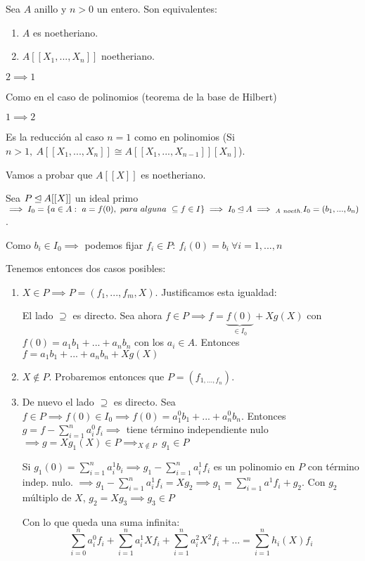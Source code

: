 \documentclass[openany]{book}
\begin{document}
\begin{theorem}
    $  $

    Sea $ A $ anillo y $ n>0 $ un entero. Son equivalentes:
    \begin{enumerate}
        \item $ A $ es noetheriano.
        \item $ A[[X_1,...,X_n]] $ noetheriano.
    \end{enumerate}

\end{theorem}

\begin{demonstration}
    $ 2\implies1 $

    Como en el caso de polinomios (teorema de la base de Hilbert)

    \noindent$ 1\implies 2 $

    Es la reducción al caso $ n = 1 $ como en polinomios (Si $ n>1,\ A[[X_1,...,X_n]]\cong A[[X_1,...,X_{n-1}]][X_n] $).

    Vamos a probar que $ A[[X]] $ es noetheriano.

    Sea $ P \unlhd A[[X]] $ un ideal primo $ \implies I_0 = \{a \in A:\ a = f(0),\ para\ alguna\ \subseteq f \in I\} \implies I_0 \ideal A \implies_{A\ noeth.} I_0 = (b_1,...,b_n)$.

    Como $ b_i \in I_0 \implies $ podemos fijar $ f_{i} \in P:\ f_i(0) =b_i\ \forall i = 1,...,n$

    Tenemos entonces dos casos posibles:
    \begin{enumerate}
        \item $ X \in P \implies P = (f_1,...,f_{m},X)$. Justificamos esta igualdad:

        El lado $ \supseteq $ es directo. Sea ahora $ f \in P \implies f = \underbrace{f(0)}_{\in I_0}+Xg(X) $ con $ f(0) = a_1b_1+...+a_nb_n $ con los $ a_i \in A $. Entonces $ f = a_1b_1+...+a_nb_n+Xg(X) $
        \item $ X \not \in P  $. Probaremos entonces que $ P = (f_{1,...,f_{n}}) $.
        \item 
        De nuevo el lado $ \supseteq  $ es directo. Sea $ f \in P \implies f(0) \in I_0 \implies f(0) = a^{0}_1b_1+...+a^{0}_nb_n$. Entonces $g = f - \sum\limits_{i=1}^{n} a_i^{0}f_{i} \implies$ tiene término independiente nulo $ \implies g = Xg_1(X) \in P \implies_{X \not \in P}\  g_1 \in P $

        Si $ g_{1}(0) = \sum\limits_{i=1}^{n}a_i^{1}b_i \implies g_{1} - \sum\limits_{i=1}^{n} a_i^{1}f_i $ es un polinomio en $ P $ con término indep. nulo. $ \implies g_{1}-\sum\limits_{i=1}^{n}a_i^{1}f_{i} = Xg_{2} \implies g_1 = \sum\limits_{i=1}^{n}a^{1}f_{i} + g_2 $. Con $ g_2 $ múltiplo de $ X $, $ g_2 = Xg_3 \implies g_3 \in P $ 

        Con lo que queda una suma infinita:
        $$ \sum\limits_{i=0}^{n}a^{0}_{i}f_i + \sum\limits_{i=1}^{n}a_i^{1}Xf_{i}+ \sum\limits_{i=1}^{n}a_i^{2}X^2f_{i}+... = \sum\limits_{i=1}^{n}h_i(X)f_i $$
    \end{enumerate}

\end{demonstration}
\end{document}

